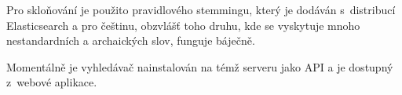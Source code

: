 Pro skloňování je použito pravidlového stemmingu, který je dodáván s~distribucí
Elasticsearch a pro češtinu, obzvlášť toho druhu, kde se vyskytuje mnoho
nestandardních a archaických slov, funguje báječně.

Momentálně je vyhledávač nainstalován na témž serveru jako API a je dostupný
z~webové aplikace.
